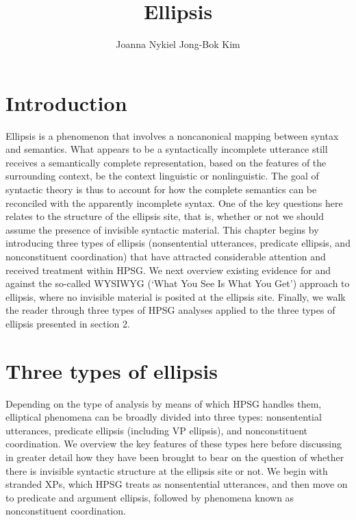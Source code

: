 \documentclass[output=paper
                ,modfonts
                ,nonflat
	        ,collection
	        ,collectionchapter
	        ,collectiontoclongg
 	        ,biblatex
                ,babelshorthands
                ,newtxmath
                ,draftmode
                ,colorlinks, citecolor=brown
]{./langsci/langscibook}
\author{%
	Joanna Nykiel\affiliation{Kyung Hee University, Seoul}%
	\lastand Jong-Bok Kim\affiliation{Kyung Hee University, Seoul}%
}
\title{Ellipsis}
\begin{document}
\maketitle
\label{chap-ellipsis}

{

\section{Introduction}
         Ellipsis is a phenomenon that involves a noncanonical mapping between syntax and semantics. What appears to be a syntactically incomplete utterance still receives a semantically complete representation, based on the features of the surrounding context, be the context linguistic or nonlinguistic. The goal of syntactic theory is thus to account for how the complete semantics can be reconciled with the apparently incomplete syntax. One of the key questions here relates to the structure of the ellipsis site, that is, whether or not we should assume the presence of invisible syntactic material. This chapter begins by introducing three types of ellipsis (nonsentential utterances, predicate ellipsis, and nonconstituent coordination) that have attracted considerable attention and received treatment within HPSG. We next overview existing evidence for and against the so-called WYSIWYG (`What You See Is What You Get') approach to ellipsis, where no invisible material is posited at the ellipsis site. Finally, we walk the reader through three types of HPSG analyses applied to the three types of ellipsis presented in section 2.


\section{Three types of ellipsis}
         Depending on the type of analysis by means of which HPSG handles them, elliptical phenomena can be broadly divided into three types:
         nonsentential utterances, predicate ellipsis (including VP ellipsis), and nonconstituent coordination.
          We overview the key features of these types here before discussing in greater detail how they have been brought to bear on the question of whether there is invisible syntactic structure at the ellipsis site or not. We begin with stranded XPs, which HPSG treats as nonsentential utterances, and then move on to predicate and argument ellipsis, followed by phenomena known as nonconstituent coordination.

}
\end{document}
